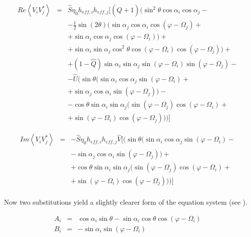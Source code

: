 \documentclass[a4paper,10pt]{thesis}
\begin{document}
\begin{eqnarray}
Re \left\langle V_i V_j^{*}\right\rangle &=& \hat{S}\eta_0 h_{eff,i} h_{eff,j}[(\hat{Q}+1) (\sin^2 \theta \cos \alpha_i \cos \alpha_j - \\
& & - \frac{1}{2}  \sin(2\theta) (\sin \alpha_j \cos \alpha_i \cos(\varphi - \Omega_j)+\nonumber \\
& & +\sin \alpha_i \cos \alpha_j \cos(\varphi - \Omega_i) ) + \nonumber \\
& & + \sin \alpha_i \sin \alpha_j \cos^2\theta \cos(\varphi - \Omega_i) \cos(\varphi - \Omega_j))+ \nonumber \\
& & + (1-\hat{Q}) \sin \alpha_i \sin \alpha_j \sin (\varphi - \Omega_i) \sin (\varphi - \Omega_j)-\nonumber \\
& & -\hat{U} (\sin \theta(\sin \alpha_i \cos \alpha_j \sin (\varphi - \Omega_i) +  \nonumber \\
& & + \sin \alpha_j \cos \alpha_i \sin (\varphi - \Omega_j))- \nonumber \\
& & - \cos \theta \sin \alpha_i \sin \alpha_j(\sin (\varphi - \Omega_j) \cos (\varphi - \Omega_i)+ \nonumber \\
& & + \sin (\varphi - \Omega_i) \cos (\varphi - \Omega_j) ) )]\nonumber
\end{eqnarray}

\begin{eqnarray}
Im \left\langle V_i V_j^{*}\right\rangle &=& - \hat{S}\eta_0 h_{eff,i} h_{eff,j} \hat{V}[ (\sin \theta(\sin \alpha_i \cos \alpha_j \sin (\varphi - \Omega_i) - \nonumber \\
& & - \sin \alpha_j \cos \alpha_i \sin (\varphi - \Omega_j))+  \\
& & +\cos \theta \sin \alpha_i \sin \alpha_j(\sin (\varphi - \Omega_j) \cos (\varphi - \Omega_i)+ \nonumber \\
& & + \sin (\varphi - \Omega_i) \cos (\varphi - \Omega_j) ) )]\nonumber
\end{eqnarray}

\paragraph*{}
Now two substitutions yield a slightly clearer form of the equation system (see \cite{cecconi04}).

\begin{eqnarray}
A_i &=& \cos \alpha_i \sin \theta - \sin \alpha_i \cos \theta \cos (\varphi - \Omega_i)\label{A_i} \\
B_i &=& -\sin \alpha_i \sin (\varphi - \Omega_i) \label{B_i}
\end{eqnarray}
\end{document}
